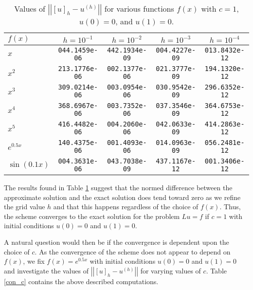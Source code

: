 \begin{table}[h!]
  \centering
  \bgroup
  \def\arraystretch{1.5}
  \begin{tabular}{| l | c | c | c | c |}
    \hline
    $f(x)$ & $h = 10^{-1}$ & $h = 10^{-2}$ & $h = 10^{-3}$ & $h = 10^{-4}$ \\
    \hline
    $x$ & \texttt{044.1459e-06} & \texttt{442.1934e-09} & \texttt{004.4227e-09} & \texttt{013.8432e-12} \\
    $x^2$ & \texttt{213.1776e-06} & \texttt{002.1377e-06} & \texttt{021.3777e-09} & \texttt{194.1320e-12} \\
    $x^3$ & \texttt{309.0214e-06} & \texttt{003.0954e-06} & \texttt{030.9542e-09} & \texttt{296.6352e-12} \\
    $x^4$ & \texttt{368.6967e-06} & \texttt{003.7352e-06} & \texttt{037.3546e-09} & \texttt{364.6753e-12} \\
    $x^5$ & \texttt{416.4482e-06} & \texttt{004.2060e-06} & \texttt{042.0633e-09} & \texttt{414.2863e-12} \\
    $e^{0.5x}$ & \texttt{140.4375e-06} & \texttt{001.4093e-06} & \texttt{014.0963e-09} & \texttt{056.2481e-12} \\
    $\sin(0.1x)$ &  \texttt{004.3631e-06} & \texttt{043.7038e-09} & \texttt{437.1167e-12} & \texttt{001.3406e-12} \\
    \hline
  \end{tabular}
  \egroup
  \caption{Values of $\left|\left|[u]_h - u^{(h)}\right|\right|$ for various functions
    $f(x)$ with $c = 1$, $u(0) = 0$, and $u(1) = 0$.}\label{con}
\end{table}

The results found in Table \ref{con} suggest that the normed difference between the approximate solution
and the exact solution does tend toward zero as we refine the grid value $h$ and
that this happens regardless of the choice of $f(x)$. Thus, the scheme converges
to the exact solution for the problem $Lu = f$ if $c=1$ with initial conditions
$u(0) = 0$ and $u(1) = 0$.

A natural question would then be if the convergence is dependent upon the choice
of $c$. As the convergence of the scheme does not appear to depend on $f(x)$, we
fix $f(x) = e^{0.5x}$ with initial conditions $u(0) = 0$ and $u(1) = 0$ and investigate
the values of $\left|\left|[u]_h - u^{(h)}\right|\right|$ for varying values of $c$.
Table \ref{con_c} contains the above described computations.

